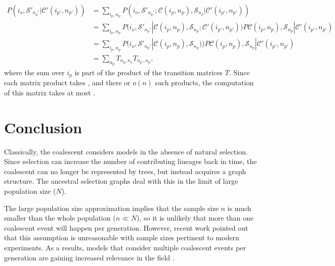 \documentclass[review]{elsarticle}
\newcommand{\sgcomment}[1]{{\color{red}{SG: #1}}}
\begin{document}
 \begin{equation}
 \begin{split}
 P(i_o, \mathcal{S}'_{n_p'} | \mathcal{C}'(i_{p'}, n_{p'})) & = \sum_{i_p,n_p} P(i_o, \mathcal{S}'_{n_p'} ; \mathcal{C}(i_p,n_p), \mathcal{S}_{n_p} | \mathcal{C}'(i_{p'}, n_{p'}))\\
 &= \sum_{i_p,n_p}  P(i_o, \mathcal{S}'_{n_p'} | \mathcal{C}(i_p,n_p), \mathcal{S}_{n_p} ; \mathcal{C}'(i_{p'}, n_{p'})) P\mathcal{C}(i_p,n_p), \mathcal{S}_{n_p} | \mathcal{C}'(i_{p'}, n_{p'}) \\
 &=  \sum_{i_p,n_p}  P(i_o, \mathcal{S}'_{n_p'} | \mathcal{C}(i_p,n_p), \mathcal{S}_{n_p})) P\mathcal{C}(i_p,n_p), \mathcal{S}_{n_p} | \mathcal{C}'(i_{p'}, n_{p'}) \\
 &=   \sum_{n_p} T_{n_p,n_o} T_{n_{p'}, n_p},
 \end{split}
\end{equation}
where the sum over $i_p$ is part of the product of the transition matrices $T$. 
Since each matrix product takes \sgcomment{scaling of practical matrix product algos}, and there or $o(n)$
such products, the computation of this matrix takes at most \sgcomment{...}.



\section{Conclusion}
\label{sec:conclusion}

Classically, the coalescent considers models in the absence of natural selection. Since selection
can increase the number of contributing lineages back in time, the coalescent can no longer be
represented by trees, but instead acquires a graph structure. The ancestral selection graphs
\citep{KroneNeuhauser1997} deal with this in the limit of large population size ($N$).

The large population size approximation implies that the sample size $n$ is much smaller than the
whole population ($n \ll N$), so it is unlikely that more than one coalescent event will happen per
generation. However, recent work \citep{BhaskarEtAl2014,NelsonEtAl2019} pointed out that this
assumption is unreasonable with sample sizes pertinent to modern experiments. As a results, models
that consider multiple coalescent events per generation are gaining increased relevance in the
field \citep{FlemmingtonVoit}.
\end{document}
